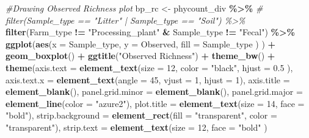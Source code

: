 \documentclass[
]{article}
\newenvironment{Shaded}{\begin{snugshade}}{\end{snugshade}}
\newcommand{\AttributeTok}[1]{\textcolor[rgb]{0.13,0.29,0.53}{#1}}
\newcommand{\CommentTok}[1]{\textcolor[rgb]{0.56,0.35,0.01}{\textit{#1}}}
\newcommand{\DecValTok}[1]{\textcolor[rgb]{0.00,0.00,0.81}{#1}}
\newcommand{\FloatTok}[1]{\textcolor[rgb]{0.00,0.00,0.81}{#1}}
\newcommand{\FunctionTok}[1]{\textcolor[rgb]{0.13,0.29,0.53}{\textbf{#1}}}
\newcommand{\NormalTok}[1]{#1}
\newcommand{\OtherTok}[1]{\textcolor[rgb]{0.56,0.35,0.01}{#1}}
\newcommand{\SpecialCharTok}[1]{\textcolor[rgb]{0.81,0.36,0.00}{\textbf{#1}}}
\newcommand{\StringTok}[1]{\textcolor[rgb]{0.31,0.60,0.02}{#1}}
\begin{document}
\begin{Shaded}
\begin{Highlighting}[]
\CommentTok{\#Drawing Observed Richness plot}
\NormalTok{bp\_rc }\OtherTok{\textless{}{-}} 
\NormalTok{      phycount\_div }\SpecialCharTok{\%\textgreater{}\%}
  \CommentTok{\# filter(Sample\_type == "Litter" | Sample\_type == "Soil") \%\textgreater{}\%}
  \FunctionTok{filter}\NormalTok{(Farm\_type }\SpecialCharTok{!=} \StringTok{"Processing\_plant"} \SpecialCharTok{\&}\NormalTok{ Sample\_type }\SpecialCharTok{!=} \StringTok{"Fecal"}\NormalTok{) }\SpecialCharTok{\%\textgreater{}\%}
  \FunctionTok{ggplot}\NormalTok{(}\FunctionTok{aes}\NormalTok{(}\AttributeTok{x =}\NormalTok{ Sample\_type,}
             \AttributeTok{y =}\NormalTok{ Observed, }
             \AttributeTok{fill =}\NormalTok{ Sample\_type}
\NormalTok{             )}
\NormalTok{         ) }\SpecialCharTok{+}
  \FunctionTok{geom\_boxplot}\NormalTok{() }\SpecialCharTok{+}
  \FunctionTok{ggtitle}\NormalTok{(}\StringTok{"Observed Richness"}\NormalTok{) }\SpecialCharTok{+}
  \FunctionTok{theme\_bw}\NormalTok{() }\SpecialCharTok{+}
  \FunctionTok{theme}\NormalTok{(}\AttributeTok{axis.text =} \FunctionTok{element\_text}\NormalTok{(}\AttributeTok{size =} \DecValTok{12}\NormalTok{, }
                                 \AttributeTok{color =} \StringTok{"black"}\NormalTok{, }
                                 \AttributeTok{hjust =} \FloatTok{0.5}
\NormalTok{                                   ),}
        \AttributeTok{axis.text.x =} \FunctionTok{element\_text}\NormalTok{(}\AttributeTok{angle =} \DecValTok{45}\NormalTok{,}
                                   \AttributeTok{vjust =} \DecValTok{1}\NormalTok{,}
                                   \AttributeTok{hjust =} \DecValTok{1}\NormalTok{),}
        \AttributeTok{axis.title =} \FunctionTok{element\_blank}\NormalTok{(),}
        \AttributeTok{panel.grid.minor =} \FunctionTok{element\_blank}\NormalTok{(),}
        \AttributeTok{panel.grid.major =} \FunctionTok{element\_line}\NormalTok{(}\AttributeTok{color =} \StringTok{"azure2"}\NormalTok{),}
        \AttributeTok{plot.title =} \FunctionTok{element\_text}\NormalTok{(}\AttributeTok{size =} \DecValTok{14}\NormalTok{, }\AttributeTok{face =} \StringTok{"bold"}\NormalTok{),}
        \AttributeTok{strip.background =} \FunctionTok{element\_rect}\NormalTok{(}\AttributeTok{fill =} \StringTok{"transparent"}\NormalTok{,}
                                        \AttributeTok{color =} \StringTok{"transparent"}\NormalTok{),}
        \AttributeTok{strip.text =} \FunctionTok{element\_text}\NormalTok{(}\AttributeTok{size =} \DecValTok{12}\NormalTok{,}
                                  \AttributeTok{face =} \StringTok{"bold"}
\NormalTok{                                  )}

\end{Highlighting}
\end{Shaded}
\end{document}
